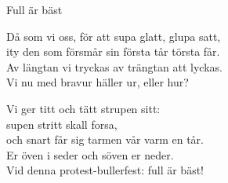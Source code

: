 \begin{song}{Full är bäst}


	
	
	Då som vi oss, för att supa glatt, glupa satt,\\
	ity den som försmår sin första tår törsta får.\\
	Av längtan vi tryckas av trängtan att lyckas.\\
	Vi nu med bravur häller ur, eller hur?

	Vi ger titt och tätt strupen sitt:\\
	supen stritt skall forsa,\\
	och snart får sig tarmen vår varm en tår.\\
	Er öven i seder och söven er neder.\\
	Vid denna protest-bullerfest: full är bäst!
	
\end{song}
